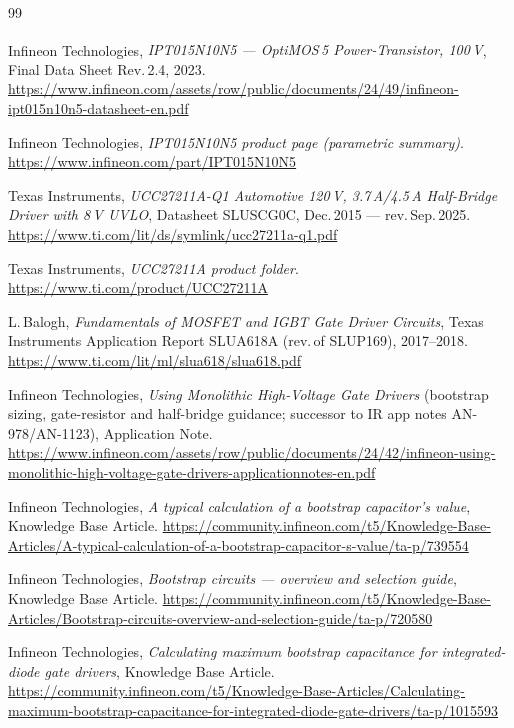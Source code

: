 \documentclass[11pt,a4paper]{article}
\begin{document}
\begin{thebibliography}{99}
\setlength{\itemsep}{3pt}

 Infineon Technologies, \emph{IPT015N10N5 --- OptiMOS\textsuperscript{\texttrademark}\,5 Power-Transistor, 100\,V}, Final Data Sheet Rev.\,2.4, 2023. \url{https://www.infineon.com/assets/row/public/documents/24/49/infineon-ipt015n10n5-datasheet-en.pdf}

 Infineon Technologies, \emph{IPT015N10N5 product page (parametric summary)}. \url{https://www.infineon.com/part/IPT015N10N5}

 Texas Instruments, \emph{UCC27211A-Q1 Automotive 120\,V, 3.7\,A/4.5\,A Half-Bridge Driver with 8\,V UVLO}, Datasheet SLUSCG0C, Dec.\,2015 --- rev.\,Sep.\,2025. \url{https://www.ti.com/lit/ds/symlink/ucc27211a-q1.pdf}

 Texas Instruments, \emph{UCC27211A product folder}. \url{https://www.ti.com/product/UCC27211A}

 L.\,Balogh, \emph{Fundamentals of MOSFET and IGBT Gate Driver Circuits}, Texas Instruments Application Report SLUA618A (rev.\,of SLUP169), 2017--2018. \url{https://www.ti.com/lit/ml/slua618/slua618.pdf}

 Infineon Technologies, \emph{Using Monolithic High-Voltage Gate Drivers} (bootstrap sizing, gate-resistor and half-bridge guidance; successor to IR app notes AN-978/AN-1123), Application Note. \url{https://www.infineon.com/assets/row/public/documents/24/42/infineon-using-monolithic-high-voltage-gate-drivers-applicationnotes-en.pdf}

 Infineon Technologies, \emph{A typical calculation of a bootstrap capacitor's value}, Knowledge Base Article. \url{https://community.infineon.com/t5/Knowledge-Base-Articles/A-typical-calculation-of-a-bootstrap-capacitor-s-value/ta-p/739554}

 Infineon Technologies, \emph{Bootstrap circuits --- overview and selection guide}, Knowledge Base Article. \url{https://community.infineon.com/t5/Knowledge-Base-Articles/Bootstrap-circuits-overview-and-selection-guide/ta-p/720580}

 Infineon Technologies, \emph{Calculating maximum bootstrap capacitance for integrated-diode gate drivers}, Knowledge Base Article. \url{https://community.infineon.com/t5/Knowledge-Base-Articles/Calculating-maximum-bootstrap-capacitance-for-integrated-diode-gate-drivers/ta-p/1015593}


\end{thebibliography}
\end{document}
